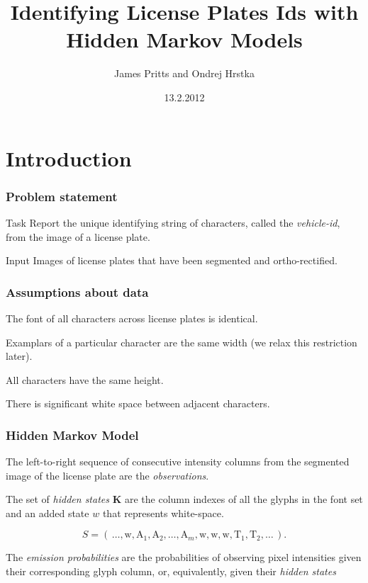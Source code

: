 \documentclass{beamer}
\title{Identifying License Plates Ids with Hidden Markov
    Models}
\author{ James Pritts and Ondrej Hrstka }
\institute[CTU FEE]{Czech technical university - Faculty of Electrical Engineering}
\date{13.2.2012}
\begin{document}
\begin{frame}
  \titlepage
\end{frame}


\section{Introduction}

\begin{frame}
  \frametitle{Problem statement}
\item[Task] Report the unique identifying string of characters, called
  the \emph{vehicle-id}, from the image of a license plate.

\item[Input] Images of license plates that have been segmented and
  ortho-rectified.
\end{frame}

\begin{frame}
  \frametitle{Assumptions about data}
\item The font of all characters across license plates is identical.
\item Examplars of a particular character are the same width (we relax this restriction later).
\item All characters have the same height.
\item There is significant white space between adjacent characters.
\end{frame}

\begin{frame}
  \frametitle{Hidden Markov Model}

\item The left-to-right sequence of consecutive intensity columns from
  the segmented image of the license plate are the
  \emph{observations}.

\item The set of \emph{hidden states} $\mathbf{K}$ are the column
  indexes of all the glyphs in the font set and an added state $w$
  that represents white-space.

\[S =
\left(\,\dots,\text{w},\text{A}_1,\text{A}_2,\ldots,\text{A}_{m},\text{w},\text{w},\text{w},\text{T}_1,\text{T}_2,\ldots\,\right).\]


\item The \emph{emission probabilities} are the probabilities of
  observing pixel intensities given their corresponding glyph column,
  or, equivalently, given their \emph{hidden states}

\end{frame}
\end{document}
